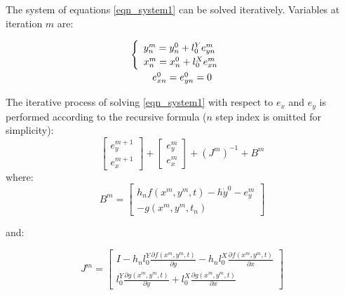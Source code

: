 \documentclass[lettersize,journal]{IEEEtran}
\begin{document}
The system of equations \eqref{eqn_system1} can be solved iteratively. Variables at iteration \(m\) are:

\begin{equation}
	\label{eqn_mitervars}
	\begin{array}{c}
		\def\arraystretch{1.3}
		\begin{array}{c}
			\begin{cases}
				\begin{array}{l}
					y_n^m =y_n^0+l_0^Ye_{yn}^m \\
					x_n^m =x_n^0+l_0^Xe_{xn}^m \\
				\end{array} \\
			\end{cases} \\
			e_{xn}^0=e_{yn}^0= 0 
		\end{array}
	\end{array}
\end{equation}

The iterative process of solving \eqref{eqn_system1} with respect to \(e_x\) and \(e_y\) is performed according to the recursive formula (\(n\) step index is omitted for simplicity):
\begin{equation}
	\label{eqn_fulliter1}
	\begin{bmatrix}
		e_{y}^{m+1} \\
		e_{x}^{m+1} 
	\end{bmatrix}
	+ 
	\begin{bmatrix}
		e_{y}^m \\
		e_{x}^m 
	\end{bmatrix}
	+ (J^{m})^{-1}
	+
	B^m
\end{equation}
\noindent where:
\begin{equation}
	B^m = 
	\begin{bmatrix}
		h_nf(x^m, y^m, t) - h \dot{y}^0 - e_y^m \\
		-g(x^m, y^m, t_n) 
	\end{bmatrix}
\end{equation}

\noindent and:

\begin{equation}
	J^m = \begin{bmatrix}
	I - h_nl_0^Y\frac{\partial f(x^m, y^m, t)}{\partial y}  -  h_nl_0^X\frac{\partial f(x^m, y^m, t)}{\partial x} \\
	l_0^Y\frac{\partial g(x^m, y^m, t)}{\partial y} +  l_0^X\frac{\partial g(x^m, y^m, t)}{\partial x} 
\end{bmatrix}
\end{equation}
\end{document}
